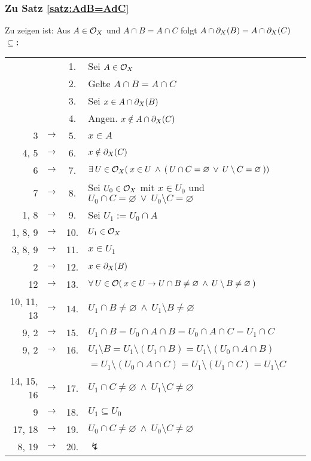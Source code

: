     


\subsubsection{Zu Satz \ref{satz:AdB=AdC}}\label{anh:AdB=AdC}
    Zu zeigen ist: Aus $A \in \mathcal{O}_X$ und $A \cap B = A \cap C$ folgt $A \cap \partial_X(B) = A \cap \partial_X(C)$\\

    \noindent
    \textbf{\glqq$\boldsymbol{\subseteq}$\grqq:}

    \begin{longtable}{r c c l}
        & & 1. & Sei $A \in \mathcal{O}_X$ \\
        & & 2. & Gelte $A \cap B = A \cap C$ \\
        & & 3. & Sei $x \in A \cap \partial_X(B)$ \\
        & & 4. & Angen. $x \notin A \cap \partial_X(C)$ \\
        3 & $\rightarrow$ & 5. & $x \in A$ \\
        4, 5 & $\rightarrow$ & 6. & $x \notin \partial_X(C)$ \\
        6 & $\rightarrow$ & 7. & $\exists\: U \in \mathcal{O}_X (\: x \in U \:\land\: (\: U \cap C = \varnothing \:\lor\: U \setminus C = \varnothing \:))$ \\
        7 & $\rightarrow$ & 8. & Sei $U_0 \in \mathcal{O}_X$ mit $x \in U_0$ und $U_0 \cap C = \varnothing \:\lor\: U_0 \setminus C = \varnothing$ \\
        1, 8 & $\rightarrow$ & 9. & Sei $U_1 := U_0 \cap A$ \\
        1, 8, 9 & $\rightarrow$ & 10. & $U_1 \in \mathcal{O}_X$ \\
        3, 8, 9 & $\rightarrow$ & 11. & $x \in U_1$ \\
        2 & $\rightarrow$ & 12. & $x \in \partial_X(B)$ \\
        12 & $\rightarrow$ & 13. & $\forall\: U \in \mathcal{O} (\: x \in U \to U \cap B \neq \varnothing \:\land\: U \setminus B \neq \varnothing \:)$ \\
        10, 11, 13 & $\rightarrow$ & 14. & $U_1 \cap B \neq \varnothing \:\land\: U_1 \setminus B \neq \varnothing$ \\
        9, 2 & $\rightarrow$ & 15. & $U_1 \cap B = U_0 \cap A \cap B = U_0 \cap A \cap C = U_1 \cap C$ \\
        9, 2 & $\rightarrow$ & 16. & $U_1 \setminus B = U_1 \setminus (U_1 \cap B) = U_1 \setminus (U_0 \cap A \cap B)$ \\
        & & & $= U_1 \setminus (U_0 \cap A \cap C) = U_1 \setminus (U_1 \cap C) = U_1 \setminus C $ \\
        14, 15, 16 & $\rightarrow$ & 17. & $U_1 \cap C \neq \varnothing \:\land\: U_1 \setminus C \neq \varnothing$ \\ 
        9 & $\rightarrow$ & 18. & $U_1 \subseteq U_0$ \\
        17, 18 & $\rightarrow$ & 19. & $U_0 \cap C \neq \varnothing \:\land\: U_0 \setminus C \neq \varnothing$ \\
        8, 19 & $\rightarrow$ & 20. & $\lightning$ 
    \end{longtable}

